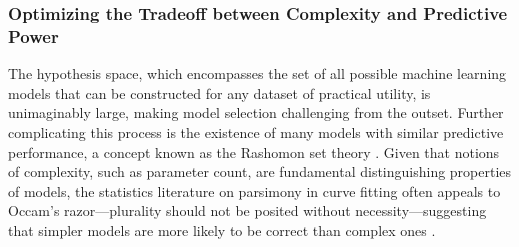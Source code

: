 \documentclass[mnsc,blindrev]{informs3}
\begin{document}
        \subsubsection{Optimizing the Tradeoff between Complexity and Predictive Power}
            \label{sec:decreasing_complexity}
            The hypothesis space, which encompasses the set of all possible machine learning models that can be constructed for any dataset of practical utility, is unimaginably large, making model selection challenging from the outset. Further complicating this process is the existence of many models with similar predictive performance, a concept known as the Rashomon set theory \citep{semenova22rashomon}. Given that notions of complexity, such as parameter count, are fundamental distinguishing properties of models, the statistics literature on parsimony in curve fitting often appeals to Occam's razor—plurality should not be posited without necessity—suggesting that simpler models are more likely to be correct than complex ones \citep{popper2005logic}.
\end{document}
